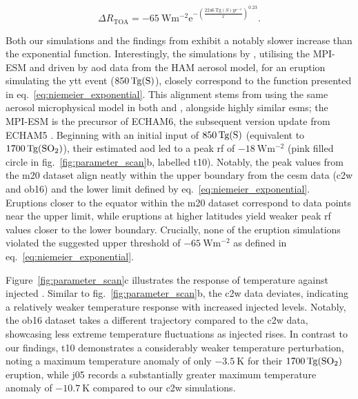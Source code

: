 \documentclass{ametsocV6.1}
\newcommand{\iso}[1][i]{{#1}njected \ce{SO2}}
\begin{document}
\begin{equation}
  \Delta
  R_{\mathrm{TOA}} =
  -\SI{65}{\watt\metre^{-2}}
  \mathrm{e}^{-{\left(\frac{\SI{2246}{\tera\gram(S)yr^{-1}}}{x}\right)}^{0.23}}.
  \label{eq:niemeier_exponential}
\end{equation}

Both our simulations and the findings from \citet{ottobliesner2016} exhibit a notably
slower increase than the exponential function. Interestingly, the simulations by
\citet{timmreck2010}, utilising the MPI-ESM and driven by \gls{aod} data from the HAM
aerosol model, for an eruption simulating the \gls{ytt} event
(\(\SI{850}{\tera\gram(\ce{S})}\)), closely correspond to the function presented in
eq.~\ref{eq:niemeier_exponential}. This alignment stems from using the same aerosol
microphysical model in both \citet{timmreck2010} and \citet{niemeier2015}, alongside
highly similar \glspl{esm}; the MPI-ESM is the precursor of ECHAM6, the subsequent
version update from ECHAM5 \citep{kuma2023}. Beginning with an initial input of
\(\SI{850}{\tera\gram(\ce{S})}\) (equivalent to \(\SI{1700}{\tera\gram(\ce{SO2})}\)),
their estimated \gls{aod} led to a peak \gls{rf} of \(\SI{-18}{\watt\metre^{-2}}\) (pink
filled circle in fig.~\ref{fig:parameter_scan}b, labelled \gls{t10}). Notably, the peak
values from the \gls{m20} dataset align neatly within the upper boundary from the
\gls{cesm} data (\gls{c2w} and \gls{ob16}) and the lower limit defined by
eq.~\ref{eq:niemeier_exponential}. Eruptions closer to the equator within the \gls{m20}
dataset correspond to data points near the upper limit, while eruptions at higher
latitudes yield weaker peak \gls{rf} values closer to the lower boundary. Crucially,
none of the eruption simulations violated the suggested upper threshold of
\(\SI{-65}{\watt\metre^{-2}}\) as defined in eq.~\ref{eq:niemeier_exponential}.

Figure~\ref{fig:parameter_scan}c illustrates the response of temperature against \iso{}.
Similar to fig.~\ref{fig:parameter_scan}b, the \gls{c2w} data deviates, indicating a
relatively weaker temperature response with increased \iso{} levels. Notably, the
\gls{ob16} dataset takes a different trajectory compared to the \gls{c2w} data,
showcasing less extreme temperature fluctuations as \iso{} rises. In contrast to our
findings, \gls{t10} demonstrates a considerably weaker temperature perturbation, noting
a maximum temperature anomaly of only \(\SI{-3.5}{\kelvin}\) for their
\(\SI{1700}{\tera\gram(\ce{SO2})}\) eruption, while \gls{j05} records a substantially
greater maximum temperature anomaly of \(\SI{-10.7}{\kelvin}\) compared to our \gls{c2w}
simulations.
\end{document}

